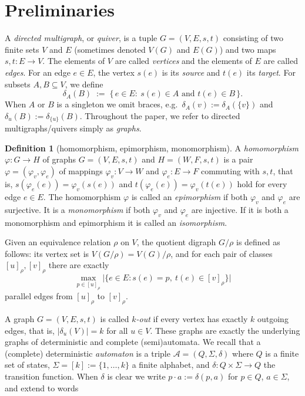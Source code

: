 \documentclass[a4paper,10pt]{amsart}
\theoremstyle{plain}
\theoremstyle{definition}
\newtheorem{definition}[theorem]{Definition}
\begin{document}
\section{Preliminaries}\label{sec: preliminaries}
A \emph{directed multigraph}, or \emph{quiver}, is a tuple $G=(V,E,s,t)$ consisting of two finite sets $V$ and $E$
(sometimes denoted $V(G)$ and $E(G)$) and two maps $s,t:E\to V$.
The elements of $V$ are called \emph{vertices} and the elements of $E$ are called \emph{edges}.
For an edge $e\in E$, the vertex $s(e)$ is its \emph{source} and $t(e)$ its \emph{target}. For subsets $A,B\subseteq V$, we define
\[
\delta_{A}(B)\;:=\;\{\,e\in E:\ s(e)\in A \text{ and } t(e)\in B\,\}.
\]
When $A$ or $B$ is a singleton we omit braces, e.g.\ $\delta_A(v):=\delta_A(\{v\})$ and $\delta_u(B):=\delta_{\{u\}}(B)$. Throughout the paper, we refer to directed multigraphs/quivers simply as \emph{graphs}.
\begin{definition}[homomorphism, epimorphism, monomorphism]
    A \emph{homomorphism} $\varphi: G \to H$ of graphs $G = (V, E, s, t)$ and $H = (W, F, s, t)$ is a pair $\varphi = (\varphi_{v}, \varphi_{e})$ of mappings $\varphi_{v}: V \to W$ and $\varphi_{e}: E \to F$ commuting with $s,t$, that is, $s(\varphi_{e}(e)) = \varphi_{v}(s(e))$ and $t(\varphi_{e}(e)) = \varphi_{v}(t(e))$ hold for every edge $e \in E$. The homomorphism $\varphi$ is called an \emph{epimorphism} if both $\varphi_{v}$ and $\varphi_{e}$ are surjective. It is a \emph{monomorphism} if both $\varphi_{v}$ and $\varphi_{e}$ are injective. If it is both a monomorphism and epimorphism it is called an \emph{isomorphism}. 
    
    Given an equivalence relation $\rho$ on $V$, the quotient digraph $G/\rho$ is defined as follows: its vertex set is $V(G/\rho)=V(G)/\rho$, and for each pair of classes $[u]_\rho,[v]_\rho$ there are exactly
\[
\max_{p\in [u]_\rho}\bigl|\{ e \in E : s(e)=p,\ t(e)\in [v]_\rho \}\bigr|
\]
parallel edges from $[u]_\rho$ to $[v]_\rho$.
\end{definition}
 A graph $G=(V,E,s,t)$ is called \emph{$k$-out} if every vertex has exactly $k$ outgoing edges, that is, $|\delta_u(V)|=k$ for all $u\in V$. These graphs are exactly the underlying graphs of deterministic and complete (semi)automata. We recall that a (complete) deterministic \emph{automaton} is a triple $\mathcal A=(Q,\Sigma,\delta)$ where $Q$ is a finite
set of states, $\Sigma=[k]:=\{1,\ldots, k\}$ a finite alphabet, and $\delta:Q\times\Sigma\to Q$ the transition function.
When $\delta$ is clear we write $p\cdot a:=\delta(p,a)$ for $p\in Q$, $a\in\Sigma$, and extend to words
\end{document}
